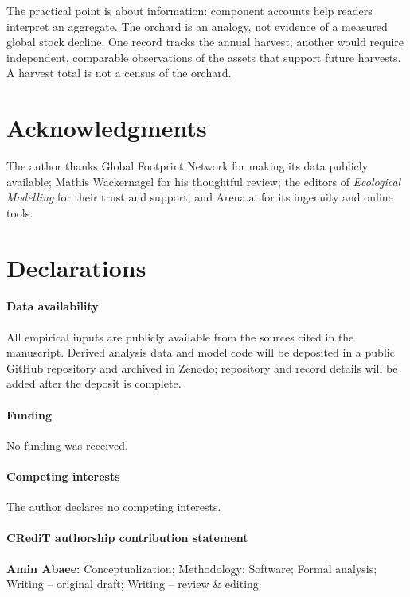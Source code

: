 \documentclass[preprint,12pt,authoryear]{elsarticle}
\begin{document}
The practical point is about information: component accounts help readers interpret an aggregate. The orchard is an analogy, not evidence of a measured global stock decline. One record tracks the annual harvest; another would require independent, comparable observations of the assets that support future harvests. A harvest total is not a census of the orchard.

\section*{Acknowledgments}

The author thanks Global Footprint Network for making its data publicly available; Mathis Wackernagel for his thoughtful review; the editors of \emph{Ecological Modelling} for their trust and support; and Arena.ai for its ingenuity and online tools.

\section*{Declarations}

\paragraph{Data availability} All empirical inputs are publicly available from the sources cited in the manuscript. Derived analysis data and model code will be deposited in a public GitHub repository and archived in Zenodo; repository and record details will be added after the deposit is complete.

\paragraph{Funding} No funding was received.

\paragraph{Competing interests} The author declares no competing interests.

\paragraph{CRediT authorship contribution statement} \textbf{Amin Abaee:} Conceptualization; Methodology; Software; Formal analysis; Writing -- original draft; Writing -- review \& editing.
\end{document}
